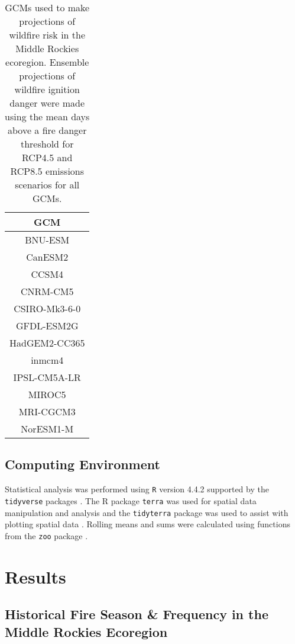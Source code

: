 \documentclass[11p]{article}
\begin{document}
\begin{table}[htbp]
  \centering
  \begin{tabular}{ c }
    \hline
    GCM \\
    \hline
    BNU-ESM \\
    CanESM2 \\
    CCSM4 \\
    CNRM-CM5 \\
    CSIRO-Mk3-6-0 \\
    GFDL-ESM2G \\
    HadGEM2-CC365 \\
    inmcm4 \\
    IPSL-CM5A-LR \\
    MIROC5 \\
    MRI-CGCM3 \\
    NorESM1-M \\
    \hline
  \end{tabular}
  \caption{GCMs used to make projections of wildfire risk in the Middle Rockies ecoregion. Ensemble projections of wildfire ignition danger were made using the mean days above a fire danger threshold for RCP4.5 and RCP8.5 emissions scenarios for all GCMs.}
  \label{table:gcms}
\end{table}

\subsection{Computing Environment}

Statistical analysis was performed using \texttt{R} version 4.4.2 \citep{rcoreteamLanguageEnvironmentStatistical2024} supported by the \texttt{tidyverse} packages \citep{hernangomezUsingTidyverseTerra2023} . The R package \texttt{terra} was used for spatial data manipulation and analysis \citep{hijmansTerraSpatialData2024} and the \texttt{tidyterra} package was used to assist with plotting spatial data \citep{hernangomezUsingTidyverseTerra2023}. Rolling means and sums were calculated using functions from the \texttt{zoo} package \citep{zeileisZooS3Infrastructure2005}.  

\section{Results}

\subsection{Historical Fire Season \& Frequency in the Middle Rockies Ecoregion}
\end{document}
